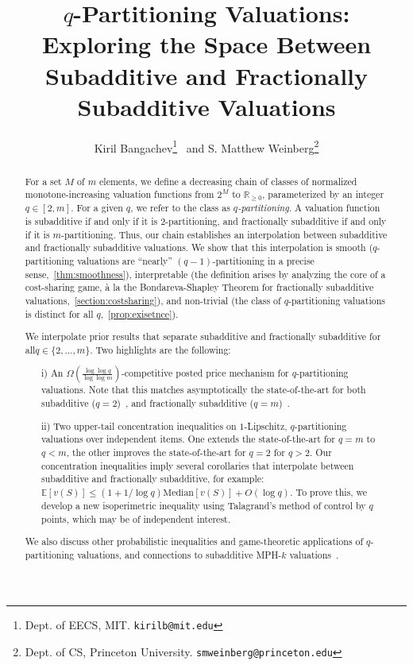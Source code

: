 \documentclass[11pt]{article}\usepackage{amsfonts}
\author{Kiril Bangachev\thanks{Dept. of EECS, MIT. \texttt{kirilb@mit.edu} } \ and S. Matthew Weinberg\thanks{Dept. of CS, Princeton University. \texttt{smweinberg@princeton.edu}}}
\title{$q$-Partitioning Valuations: Exploring the Space Between\\
Subadditive and Fractionally Subadditive Valuations}
\numberwithin{theorem}{subsection}
\begin{document}
\maketitle
\begin{abstract}


For a set $M$ of $m$ elements, we define a decreasing chain of classes of normalized monotone-increasing valuation functions from $2^M$ to $\mathbb{R}_{\geq 0}$, parameterized by an integer $q \in [2,m]$. For a given $q$, we refer to the class as \emph{$q$-partitioning}. A valuation function is subadditive if and only if it is $2$-partitioning, and fractionally subadditive if and only if it is $m$-partitioning. Thus, our chain establishes an interpolation between subadditive and fractionally subadditive valuations. We show that this interpolation is smooth ($q$-partitioning valuations are ``nearly'' $(q-1)$-partitioning in a precise sense,~\cref{thm:smoothness}), interpretable (the definition arises by analyzing the core of a cost-sharing game, \`{a} la the Bondareva-Shapley Theorem for fractionally subadditive valuations,~\cref{section:costsharing}), and non-trivial (the class of $q$-partitioning valuations is distinct for all $q$,~\cref{prop:exisetnce}).

We interpolate prior results that separate subadditive and fractionally subadditive for all\linebreak $q \in \{2,\ldots, m\}$. Two highlights are the following:
\begin{enumerate}
\item[i)] An $\Omega \left(\frac{\log \log q}{\log \log m}\right)$-competitive posted price mechanism for $q$-partitioning valuations. Note that this matches asymptotically the state-of-the-art for both subadditive ($q=2$)~\cite{DuttingKL20}, and fractionally subadditive ($q=m$)~\cite{FeldmanGL15}.
\item[ii)]  Two upper-tail concentration inequalities on $1$-Lipschitz, $q$-partitioning valuations over independent items. One extends the state-of-the-art for $q=m$ to $q<m$, the other improves the state-of-the-art for $q=2$ for $q > 2$. Our concentration inequalities imply several corollaries that interpolate between subadditive and fractionally subadditive, for example: $\mathbb{E}[v(S)]\le (1 + 1/\log q)\text{Median}[v(S)] + O(\log q)$. To prove this, we develop a new isoperimetric inequality using Talagrand's method of control by $q$ points, which may be of independent interest.\end{enumerate}

We also discuss other probabilistic inequalities and game-theoretic applications of $q$-partitioning valuations, and connections to subadditive MPH-$k$ valuations~\cite{EzraFNTW19}.
\end{abstract}
\end{document}
